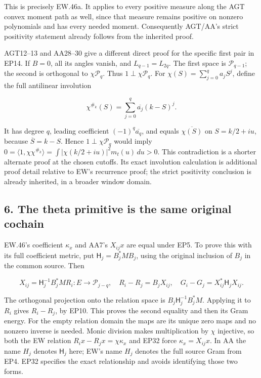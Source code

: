 This is precisely EW.46a. It applies to every positive measure along the AGT convex moment path as well, since that measure remains positive on nonzero polynomials and has every needed moment. Consequently AGT/AA's strict positivity statement already follows from the inherited proof.

AGT12--13 and AA28--30 give a different direct proof for the specific first pair in EP14. If \(B=0\), all its angles vanish, and \(L_{q-1}=L_{2q}\). The first space is \(\mathcal P_{q-1}\); the second is orthogonal to \(\chi\mathcal P_q\). Thus \(1\perp\chi\mathcal P_q\). For \(\chi(S)=\sum_{j=0}^q a_jS^j\), define the full antilinear involution

\[
\chi^{\#_k}(S)=\sum_{j=0}^q\overline{a_j}(k-S)^j.
\tag{EP31}
\]

It has degree \(q\), leading coefficient \((-1)^q\overline{a_q}\), and equals \(\overline{\chi(S)}\) on \(S=k/2+iu\), because \(\overline S=k-S\). Hence \(1\perp\chi\mathcal P_q\) would imply \(0=\langle1,\chi\chi^{\#_k}\rangle=\int|\chi(k/2+iu)|^2m_t(u)\,du>0\). This contradiction is a shorter alternate proof at the chosen cutoffs. Its exact involution calculation is additional proof detail relative to EW's recurrence proof; the strict positivity conclusion is already inherited, in a broader window domain.

\subsection{6. The theta primitive is the same original cochain}\label{the-theta-primitive-is-the-same-original-cochain}

EW.46's coefficient \(\kappa_x\) and AA7's \(X_{ij}x\) are equal under EP5. To prove this with its full coefficient metric, put \(\mathsf H_j=B_j^*MB_j\), using the original inclusion of \(B_j\) in the common source. Then

\[
X_{ij}=\mathsf H_j^{-1}B_j^*MR_i:E\to\mathcal P_{j-q},\quad
R_i-R_j=B_jX_{ij},\quad
G_i-G_j=X_{ij}^*\mathsf H_jX_{ij}.
\tag{EP32}
\]

The orthogonal projection onto the relation space is \(B_j\mathsf H_j^{-1}B_j^*M\). Applying it to \(R_i\) gives \(R_i-R_j\), by EP10. This proves the second equality and then its Gram energy. For the empty relation domain the maps are its unique zero maps and no nonzero inverse is needed. Monic division makes multiplication by \(\chi\) injective, so both the EW relation \(R_ix-R_jx=\chi\kappa_x\) and EP32 force \(\kappa_x=X_{ij}x\). In AA the name \(H_j\) denotes \(\mathsf H_j\) here; EW's name \(H_j\) denotes the full source Gram from EP4. EP32 specifies the exact relationship and avoids identifying those two forms.

